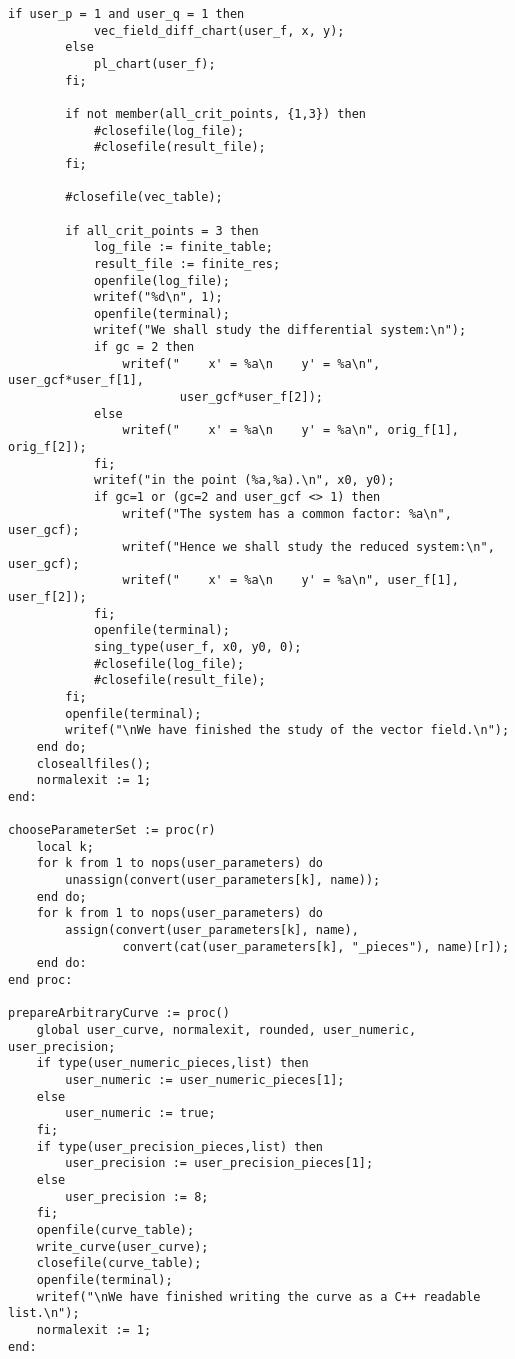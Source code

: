 \documentclass[a4paper,10pt]{article}
\begin{document}
\begin{lstlisting}[name=main]
        if user_p = 1 and user_q = 1 then
            vec_field_diff_chart(user_f, x, y);
        else
            pl_chart(user_f);
        fi;

        if not member(all_crit_points, {1,3}) then
            #closefile(log_file);
            #closefile(result_file);
        fi;

        #closefile(vec_table);

        if all_crit_points = 3 then
            log_file := finite_table;
            result_file := finite_res;
            openfile(log_file);
            writef("%d\n", 1);
            openfile(terminal);
            writef("We shall study the differential system:\n");
            if gc = 2 then
                writef("    x' = %a\n    y' = %a\n", user_gcf*user_f[1],
                        user_gcf*user_f[2]);
            else
                writef("    x' = %a\n    y' = %a\n", orig_f[1], orig_f[2]);
            fi;
            writef("in the point (%a,%a).\n", x0, y0);
            if gc=1 or (gc=2 and user_gcf <> 1) then
                writef("The system has a common factor: %a\n", user_gcf);
                writef("Hence we shall study the reduced system:\n", user_gcf);
                writef("    x' = %a\n    y' = %a\n", user_f[1], user_f[2]);
            fi;
            openfile(terminal);
            sing_type(user_f, x0, y0, 0);
            #closefile(log_file);
            #closefile(result_file);
        fi;
        openfile(terminal);
        writef("\nWe have finished the study of the vector field.\n");
    end do;
    closeallfiles();
    normalexit := 1;
end:

chooseParameterSet := proc(r)
    local k;
    for k from 1 to nops(user_parameters) do
        unassign(convert(user_parameters[k], name));
    end do;
    for k from 1 to nops(user_parameters) do
        assign(convert(user_parameters[k], name),
                convert(cat(user_parameters[k], "_pieces"), name)[r]);
    end do:
end proc:

prepareArbitraryCurve := proc()
    global user_curve, normalexit, rounded, user_numeric, user_precision;
    if type(user_numeric_pieces,list) then
        user_numeric := user_numeric_pieces[1];
    else
        user_numeric := true;
    fi;
    if type(user_precision_pieces,list) then
        user_precision := user_precision_pieces[1];
    else
        user_precision := 8;
    fi;
    openfile(curve_table);
    write_curve(user_curve);
    closefile(curve_table);
    openfile(terminal);
    writef("\nWe have finished writing the curve as a C++ readable list.\n");    
    normalexit := 1;
end:


\end{lstlisting}
\end{document}
